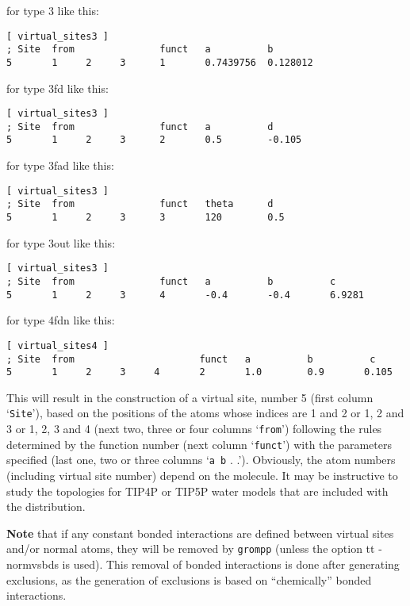 for type 3 like this:
{\small
\begin{verbatim}
[ virtual_sites3 ]
; Site  from               funct   a          b
5       1     2     3      1       0.7439756  0.128012
\end{verbatim}}

for type 3fd like this:
{\small
\begin{verbatim}
[ virtual_sites3 ]
; Site  from               funct   a          d
5       1     2     3      2       0.5        -0.105
\end{verbatim}}

for type 3fad like this:
{\small
\begin{verbatim}
[ virtual_sites3 ]
; Site  from               funct   theta      d
5       1     2     3      3       120        0.5
\end{verbatim}}

for type 3out like this:
{\small
\begin{verbatim}
[ virtual_sites3 ]
; Site  from               funct   a          b          c
5       1     2     3      4       -0.4       -0.4       6.9281
\end{verbatim}}

for type 4fdn like this:
{\small
\begin{verbatim}
[ virtual_sites4 ]
; Site  from                      funct   a          b          c
5       1     2     3     4       2       1.0        0.9       0.105
\end{verbatim}}

This will result in the construction of a virtual site, number 5
(first column `{\tt Site}'), based on the positions of the atoms
whose indices are 1 and 2 or 1, 2 and 3 or 1, 2, 3 and 4 (next two,
three or four columns `{\tt from}') following the rules determined by the function number
(next column `{\tt funct}') with the parameters specified (last one,
two or three columns `{\tt a b} . .'). Obviously, the atom numbers
(including virtual site number) depend
on the molecule. It may be instructive to study the topologies for
TIP4P or TIP5P water models that are included with the {\gromacs} distribution.

{\bf Note} that if any constant bonded interactions are defined between
virtual sites and/or normal atoms, they will be removed by {\tt grompp}
(unless the option {tt -normvsbds} is used).
This removal of bonded interactions is done after generating exclusions,
as the generation of exclusions is based on ``chemically'' bonded interactions.

